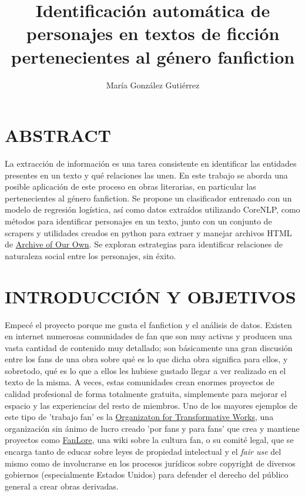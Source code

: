 \documentclass{pre-tfg}
\title{Identificación automática de personajes en textos de ficción pertenecientes al género fanfiction}
\author{María González Gutiérrez}
\begin{document}
\maketitle
\tableofcontents

\cleardoublepage

\clearpage

\cleardoublepage
\section{ABSTRACT}
La extracción de información es una tarea consistente en identificar las entidades presentes en un texto y qué relaciones las unen. En este trabajo se aborda una posible aplicación de este proceso en obras literarias, en particular las pertenecientes al género fanfiction. Se propone un clasificador entrenado con un modelo de regresión logística, así como datos extraídos utilizando CoreNLP, como métodos para identificar personajes en un texto, junto con un conjunto de scrapers y utilidades creados en python para extraer y manejar archivos HTML de \href{http://www.archiveofourown.org}{Archive of Our Own}. Se exploran estrategias para identificar relaciones de naturaleza social entre los personajes, sin éxito.

\cleardoublepage
\section{INTRODUCCIÓN Y OBJETIVOS}

Empecé el proyecto porque me gusta el fanfiction y el análisis de datos. Existen en internet numerosas comunidades de fan que son muy activas y producen una vasta cantidad de contenido muy detallado; son básicamente una gran discusión entre los fans de una obra sobre qué es lo que dicha obra significa para ellos, y sobretodo, qué es lo que a ellos les hubiese gustado llegar a ver realizado en el texto de la misma. A veces, estas comunidades crean enormes proyectos de calidad profesional de forma totalmente gratuita, simplemente para mejorar el espacio y las experiencias del resto de miembros. Uno de los mayores ejemplos de este tipo de 'trabajo fan' es la \href{https://www.transformativeworks.org/}{Organizaton for Transformative Works}, una organización sin ánimo de lucro creado 'por fans y para fans' que crea y mantiene proyectos como \href{https://fanlore.org/wiki/Main_Page}{FanLore}, una wiki sobre la cultura fan, o su comité legal, que se encarga tanto de educar sobre leyes de propiedad intelectual y el \textit{fair use} del mismo como de involucrarse en los procesos jurídicos sobre copyright de diversos gobiernos (especialmente Estados Unidos) para defender el derecho del público general a crear obras derivadas.
\end{document}
